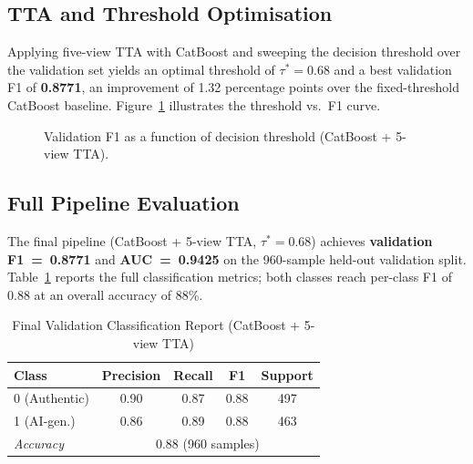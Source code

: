 \documentclass[conference]{IEEEtran}
\begin{document}
\subsection{TTA and Threshold Optimisation}

Applying five-view TTA with CatBoost and sweeping the decision threshold over
the validation set yields an optimal threshold of $\tau^{*}=0.68$ and a
best validation F1 of \textbf{0.8771}, an improvement of 1.32 percentage points
over the fixed-threshold CatBoost baseline.  Figure~\ref{fig:threshold}
illustrates the threshold vs.\ F1 curve.

\begin{figure}[t]
  \centering
  \caption{Validation F1 as a function of decision threshold (CatBoost + 5-view TTA).}
  \label{fig:threshold}
\end{figure}

\subsection{Full Pipeline Evaluation}

The final pipeline (CatBoost + 5-view TTA, $\tau^{*}=0.68$) achieves
\textbf{validation F1~=~0.8771} and \textbf{AUC~=~0.9425} on the 960-sample
held-out validation split.  Table~\ref{tab:final} reports the full
classification metrics; both classes reach per-class F1 of 0.88 at an overall
accuracy of 88\%.

\begin{table}[t]
  \caption{Final Validation Classification Report (CatBoost + 5-view TTA)}
  \label{tab:final}
  \centering
  \setlength{\tabcolsep}{4pt}
  \begin{tabular}{lcccc}
    \toprule
    \textbf{Class} & \textbf{Precision} & \textbf{Recall} & \textbf{F1} & \textbf{Support} \\
    \midrule
    0 (Authentic) & 0.90 & 0.87 & 0.88 & 497 \\
    1 (AI-gen.)   & 0.86 & 0.89 & 0.88 & 463 \\
    \midrule
    \textit{Accuracy} & \multicolumn{4}{c}{0.88 \quad (960 samples)} \\
    \bottomrule
  \end{tabular}
\end{table}
\end{document}
